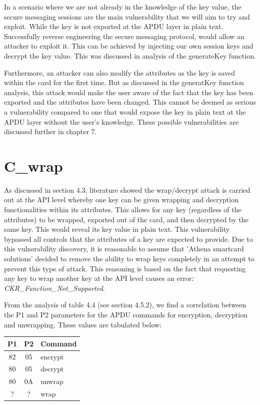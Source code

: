\documentclass[bsc,frontabs,twoside,singlespacing,parskip,deptreport]{infthesis}     %
\begin{document}
In a scenario where we are not already in the knowledge of the key value, the secure messaging sessions are the main vulnerability that we will aim to try and exploit. While the key is not exported at the APDU layer in plain text. Successfully reverse engineering the secure messaging protocol, would allow an attacker to exploit it. This can be achieved by injecting our own session keys and decrypt the key value. This was discussed in analysis of the generateKey function.


Furthermore, an attacker can also modify the attributes as the key is saved within the card for the first time. But as discussed in the generatKey function analysis, this attack would make the user aware of the fact that the key has been exported and the attributes have been changed. This cannot be deemed as serious a vulnerability compared to one that would expose the key in plain text at the APDU layer without the user's knowledge. These possible vulnerabilities are discussed further in chapter 7.


\section{C\_wrap}
As discussed in section 4.3, literature showed the wrap/decrypt attack is carried out at the API level whereby one key can be given wrapping and decryption functionalities within its attributes. This allows for any key (regardless of the attributes) to be wrapped, exported out of the card, and then decrypted by the same key. This would reveal its key value in plain text. This vulnerability bypassed all controls that the attributes of a key are expected to provide. Due to this vulnerability discovery, it is reasonable to assume that 'Athena smartcard solutions' decided to remove the ability to wrap keys completely in an attempt to prevent this type of attack. This reasoning is based on the fact that requesting any key to wrap another key at the API level causes an error: \textit{CKR\_Function\_Not\_Supported}.

From the analysis of table 4.4 (see section 4.5.2), we find a correlation between the P1 and P2 parameters for the APDU commands for encryption, decryption and unwrapping. These values are tabulated below:

\begin{table}[H]
\begin{tabular}{|c|c|l|}
\hline
P1 & P2 & Command\\
\hline
82 & 05 & encrypt\\
80 & 05 & decrypt\\
80 & 0A & unwrap\\
? & ? & wrap\\
\hline
\end{tabular}
\end{table}
\end{document}
